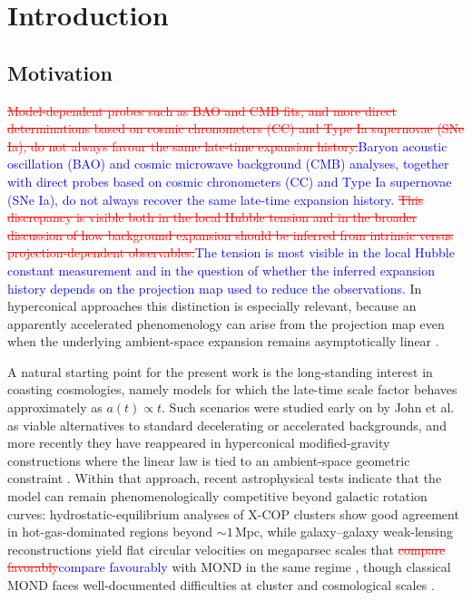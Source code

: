 \documentclass[3p,times,twocolumn]{elsarticle}
\begin{document}
\section{Introduction}

\subsection{Motivation}

\textcolor{red}{\sout{Model-dependent probes such as BAO and CMB fits, and more direct determinations based on cosmic chronometers (CC) and Type Ia supernovae (SNe Ia), do not always favour the same late-time expansion history.}}\textcolor{blue}{Baryon acoustic oscillation (BAO) and cosmic microwave background (CMB) analyses, together with direct probes based on cosmic chronometers (CC) and Type Ia supernovae (SNe Ia), do not always recover the same late-time expansion history.} \textcolor{red}{\sout{This discrepancy is visible both in the local Hubble tension and in the broader discussion of how background expansion should be inferred from intrinsic versus projection-dependent observables.}}\textcolor{blue}{The tension is most visible in the local Hubble constant measurement and in the question of whether the inferred expansion history depends on the projection map used to reduce the observations.} In hyperconical approaches this distinction is especially relevant, because an apparently accelerated phenomenology can arise from the projection map even when the underlying ambient-space expansion remains asymptotically linear \cite{monjo2018projected, monjo2023hubble}.

A natural starting point for the present work is the long-standing interest in coasting cosmologies, namely models for which the late-time scale factor behaves approximately as $a(t)\propto t$. Such scenarios were studied early on by John et al. \cite{john2000coasting, John2019} as viable alternatives to standard decelerating or accelerated backgrounds, and more recently they have reappeared in hyperconical modified-gravity constructions where the linear law is tied to an ambient-space geometric constraint \cite{monjo2017hyperconical, Monjo_2024, Monjo_2025}. Within that approach, recent astrophysical tests indicate that the model can remain phenomenologically competitive beyond galactic rotation curves: hydrostatic-equilibrium analyses of X-COP clusters show good agreement in hot-gas-dominated regions beyond $\sim1\,\mathrm{Mpc}$, while galaxy--galaxy weak-lensing reconstructions yield flat circular velocities on megaparsec scales that \textcolor{red}{\sout{compare favorably}}\textcolor{blue}{compare favourably} with MOND in the same regime \cite{monjo2025clusters, monjo2025lensing}, though classical MOND faces well-documented difficulties at cluster and cosmological scales \cite{oikonomou2026mond}.
\end{document}

